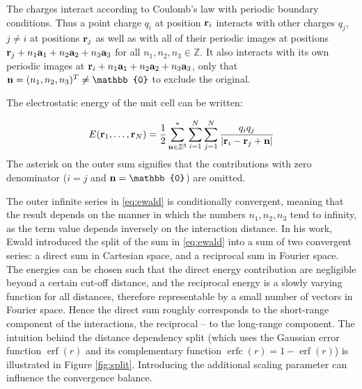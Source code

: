 \documentclass[12pt,a4paper,notitlepage]{report}
\DeclareMathOperator\erf{erf}
\DeclareMathOperator\erfc{erfc}
\begin{document}
The charges interact according to Coulomb’s law with periodic boundary conditions. Thus a point charge $q_i$ at position $\bold{r}_i$ interacts with
other charges $q_j$, $j \neq i$ at positions $\bold{r}_j$ as well as with all of
their periodic images at positions $\bold{r}_j + n_1 \bold{a}_1  + n_2 \bold{a}_2  + n_3 \bold{a}_3$ for
all $n_1, n_2 , n_3 \in \mathbb{Z}$. It also interacts with its own periodic
images at $\bold{r}_i + n_1 \bold{a}_1  + n_2 \bold{a}_2  + n_3 \bold{a}_3$, only that  $\bold{n} = (n_1, n_2, n_3)^T \neq \mathbb{0}$ to exclude the original. 

The electrostatic energy of the unit cell can be written:

\begin{equation} \label{eq:ewald}
E(\bold{r}_1, \dotsc, \bold{r}_N) = \frac{1}{2} \sum\limits_{\bold{n} \in \mathbb{Z}^3}^* \sum_{i=1}^N \sum\limits_{j=1}^N \frac{q_i q_j}{\lvert\bold{r}_i - \bold{r}_j + \bold{n} \rvert}
\end{equation}
The asterisk on the outer sum signifies that the contributions with zero denominator ($i =j$ and $\bold{n} = \mathbb{0}$) are omitted.

The outer infinite series in \eqref{eq:ewald} is conditionally convergent, meaning that the result depends on the manner in which the numbers $n_1, n_2, n_3$ tend to infinity, as the term value depends inversely on the interaction distance.
In his work, Ewald \cite{ewald} introduced the split of the sum in \eqref{eq:ewald} into a sum of two convergent series: a direct sum in Cartesian space, and a
reciprocal sum in Fourier space. The energies can be chosen such that the direct energy contribution are negligible beyond a certain cut-off distance, and the reciprocal energy is a slowly varying function for all distances, therefore representable by a small number of vectors in Fourier space. Hence the direct sum roughly corresponds to the short-range component of the interactions, the reciprocal -- to the long-range component. The intuition behind the distance dependency split (which uses the Gaussian error function $\erf(r)$ and its complementary function $\erfc(r) = 1 - \erf(r)$) is illustrated in Figure \ref{fig:split}. Introducing the additional scaling parameter can influence the convergence balance. 
\end{document}
